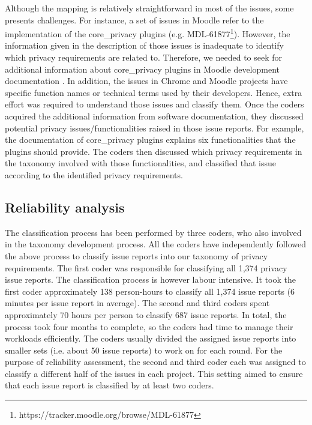 Although the mapping is relatively straightforward in most of the issues, some presents challenges. For instance, a set of issues in Moodle refer to the implementation of the core\_privacy plugins (e.g. MDL-61877\footnote{https://tracker.moodle.org/browse/MDL-61877}). However, the information given in the description of those issues is inadequate to identify which privacy requirements are related to. Therefore, we needed to seek for additional information about core\_privacy plugins in Moodle development documentation \cite{Moodle2019}. In addition, the issues in Chrome and Moodle projects have specific function names or technical terms used by their developers. Hence, extra effort was required to understand those issues and classify them. Once the coders acquired the additional information from software documentation, they discussed potential privacy issues/functionalities raised in those issue reports. For example, the documentation of core\_privacy plugins explains six functionalities that the plugins should provide. The coders then discussed which privacy requirements in the taxonomy involved with those functionalities, and classified that issue according to the identified privacy requirements.

\subsection{Reliability analysis} \label{subsec:mining-reliability}

The classification process has been performed by three coders, who also involved in the taxonomy development process. All the coders have independently followed the above process to classify issue reports into our taxonomy of privacy requirements. The first coder was responsible for classifying all 1,374 privacy issue reports. The classification process is however labour intensive. It took the first coder approximately 138 person-hours to classify all 1,374 issue reports (6 minutes per issue report in average). The second and third coders spent approximately 70 hours per person to classify 687 issue reports. In total, the process took four months to complete, so the coders had time to manage their workloads efficiently. The coders usually divided the assigned issue reports into smaller sets (i.e. about 50 issue reports) to work on for each round. For the purpose of reliability assessment, the second and third coder each was assigned to classify a different half of the issues in each project. This setting aimed to ensure that each issue report is classified by at least two coders.

